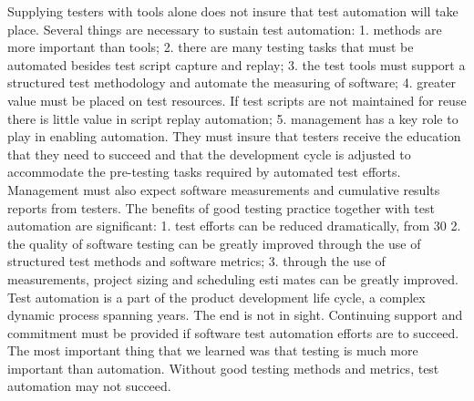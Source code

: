 Supplying testers with tools alone does not insure that test automation will
take place. Several things are necessary to sustain test automation:
1. methods are more important than tools;
2. there are many testing tasks that must be automated besides test script
capture and replay;
3. the test tools must support a structured test methodology and automate
the measuring of software;
4. greater value must be placed on test resources. If test scripts are not
maintained for reuse there is little value in script replay automation;
5. management has a key role to play in enabling automation. They must
insure that testers receive the education that they need to succeed and
that the development cycle is adjusted to accommodate the pre-testing
tasks required by automated test efforts. Management must also expect
software measurements and cumulative results reports from testers.
The benefits of good testing practice together with test automation are
significant:
1. test efforts can be reduced dramatically, from 30%
2. the quality of software testing can be greatly improved through the use
of structured test methods and software metrics;
3. through the use of measurements, project sizing and scheduling esti
mates can be greatly improved.
Test automation is a part of the product development life cycle, a complex
dynamic process spanning years. The end is not in sight. Continuing support
and commitment must be provided if software test automation efforts
are to succeed. The most important thing that we learned was that testing is
much more important than automation. Without good testing methods and
metrics, test automation may not succeed. 

